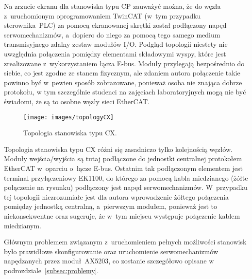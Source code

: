 Na zrzucie ekranu dla stanowiska typu CP zauważyć można, że do węzła z~uruchomionym oprogramowaniem TwinCAT (w~tym przypadku sterownika~PLC) za pomocą ekranowanej skrętki został podłączony napęd serwomechanizmów, a~dopiero do niego za pomocą tego samego medium transmisyjnego zdalny zestaw modułów I/O. Podgląd topologii niestety nie uwzględnia połączenia pomiędzy elementami składowymi wyspy, które jest zrealizowane z~wykorzystaniem łącza E-bus. Moduły przylegają bezpośrednio do siebie, co jest zgodne ze stanem fizycznym, ale zdaniem autora połączenie takie powinno być w~pewien sposób zobrazowane, ponieważ osoba nie znająca dobrze protokołu, w tym szczególnie studenci na zajęciach laboratoryjnych mogą nie być świadomi, że są to osobne węzły sieci EtherCAT.
\clearpage
\begin{figure}[!htb] 	\centering 	\texttt{[image: images/topologyCX]} \caption{Topologia stanowiska typu CX.} \label{topology:cx} \end{figure}

Topologia stanowiska typu CX różni się zasadniczo tylko kolejnością węzłów. Moduły wejścia/wyjścia są tutaj podłączone do jednostki centralnej protokołem EtherCAT w~oparciu o~łącze E-bus. Ostatnim tak podłączonym elementem jest terminal przyłączeniowy EK1100, do którego za pomocą kabla miedzianego (żółte połączenie na rysunku) podłączony jest napęd serwomechanizmów. W~przypadku tej topologii niezrozumiałe jest dla autora wprowadzenie żółtego połączenia pomiędzy jednostką centralną, a~pierwszym modułem, ponieważ jest to niekonsekwentne oraz sugeruje, że w~tym miejscu występuje połączenie kablem miedzianym.

Głównym problemem związanym z~uruchomieniem pełnych możliwości stanowisk było prawidłowe skonfigurowanie oraz uruchomienie serwomechanizmów napędzanych przez moduł~AX5203, co zostanie szczegółowo opisane w podrozdziale~\ref{subsec:problemy}.

